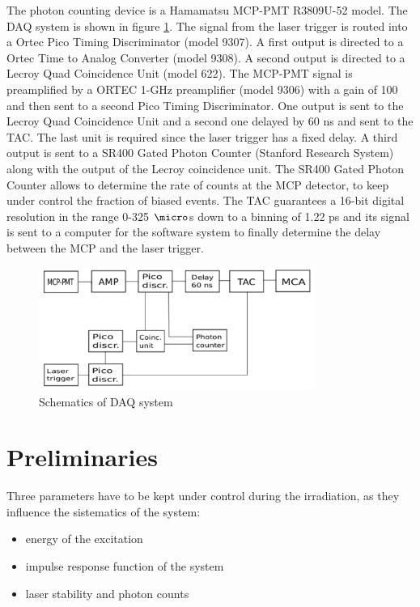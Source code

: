 The photon counting device is a Hamamatsu MCP-PMT R3809U-52 model. The DAQ system is shown in figure \ref{fig:daq}.
The signal from the laser trigger is routed into a Ortec Pico Timing Discriminator (model 9307). A first output is directed to a Ortec Time to Analog Converter (model 9308).
A second output is directed to a Lecroy Quad Coincidence Unit (model 622).
The MCP-PMT signal is preamplified by a ORTEC 1-GHz preamplifier (model 9306) with a gain of 100 and then sent to a second Pico Timing Discriminator. One output is sent to the Lecroy Quad Coincidence Unit and a second one delayed by 60 ns and sent to the TAC. The last unit is required since the laser trigger has a fixed delay. 
A third output is sent to a SR400 Gated Photon Counter (Stanford Research System) along with the output of the Lecroy coincidence unit.
The SR400 Gated Photon Counter allows to determine the rate of counts at the MCP detector, to keep under control the fraction of biased events.
The TAC guarantees a 16-bit digital resolution in the range 0-325 $\micro$s down to a binning of 1.22 ps and its signal is sent to a computer for the software system to finally determine the delay between the MCP and the laser trigger.
\begin{figure}[htbp]
\begin{center}
\includegraphics[width=9cm]{../Pictures/Chapter_7/electronics.pdf}
\end{center}
\caption[VUV DAQ]{Schematics of DAQ system}
\label{fig:daq}
\end{figure}

\section{Preliminaries}
Three parameters have to be kept under control during the irradiation, as they influence the sistematics of the system:
\begin{itemize}
\item energy of the excitation
\item impulse response function of the system
\item laser stability and photon counts
\end{itemize}

